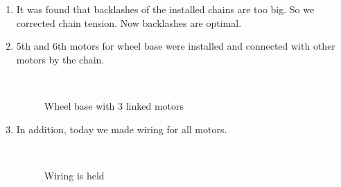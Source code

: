 \begin{enumerate}
\begin{enumerate}
		\item It was found that backlashes of the installed chains are too big. So we corrected chain tension. Now backlashes are optimal.
		
        \item 5th and 6th motors for wheel base were installed and connected with other motors by the chain.
        \begin{figure}[H]
        	\begin{minipage}[h]{0.2\linewidth}
        		\center  
        	\end{minipage}
        	\begin{minipage}[h]{0.6\linewidth}
        		\caption{Wheel base with 3 linked motors}
        	\end{minipage}
        \end{figure}
        
        \item In addition, today we made wiring for all motors.
        \begin{figure}[H]
        	\begin{minipage}[h]{0.2\linewidth}
        		\center  
        	\end{minipage}
        	\begin{minipage}[h]{0.6\linewidth}
        		\caption{Wiring is held}
        	\end{minipage}
        \end{figure}


\end{enumerate}
\end{enumerate}
